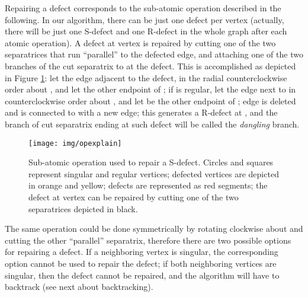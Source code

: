\documentclass[11pt,a4paper]{article}
\begin{document}
Repairing a defect corresponds to the sub-atomic operation described in the following. 
In our algorithm, there can be just one defect per vertex (actually, there will be just one S-defect and one R-defect in the whole graph after each atomic operation). 
A defect at vertex  is repaired by cutting one of the two separatrices that run ``parallel'' to the defected edge, and attaching one of the two branches of the cut separatrix to  at the defect.
This is accomplished as depicted in Figure \ref{fig:repair}: let  the edge adjacent to the defect, in the radial counterclockwise order about , and let  the other endpoint of ; if  is regular, let  the edge next to  in counterclockwise order about , and let  be the other endpoint of ; edge  is deleted and  is connected to  with a new edge; this generates a R-defect at , and the branch of cut separatrix ending at such defect will be called the \emph{dangling} branch.

\begin{figure}
\centering
\mbox{}
\hfill
\centerline{\texttt{[image: img/opexplain]}}


\hfill\mbox{}
\caption{\label{fig:repair} Sub-atomic operation used to repair a S-defect. Circles and squares represent singular and regular vertices; defected vertices are depicted in orange and yellow; defects are represented as red segments; the defect at vertex  can be repaired by cutting one of the two separatrices depicted in black.
}
\end{figure}


The same operation could be done symmetrically by rotating clockwise about  and cutting the other ``parallel'' separatrix, therefore there are two possible options for repairing a defect. 
If a neighboring vertex  is singular, the corresponding option cannot be used to repair the defect; 
if both neighboring vertices are singular, then the defect cannot be repaired, and the algorithm will have to backtrack (see next about backtracking).
\end{document}

